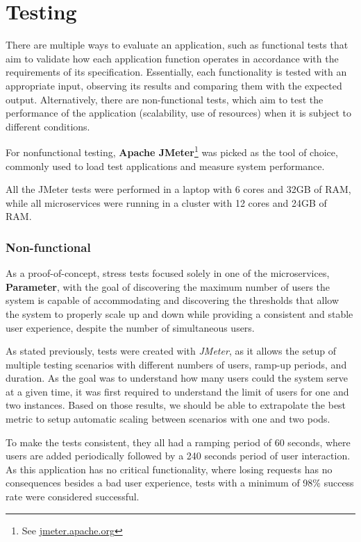 \chapter{Testing}
\label{ch:testing}

There are multiple ways to evaluate an application, such as functional tests that aim to validate how each application function operates in accordance with the requirements of its specification. Essentially, each functionality is tested with an appropriate input, observing its results and comparing them with the expected output. Alternatively, there are non-functional tests, which aim to test the performance of the application (scalability, use of resources) when it is subject to different conditions.

For nonfunctional testing, \textbf{Apache JMeter}\footnote{See \href{https://jmeter.apache.org/}{jmeter.apache.org}} was picked as the tool of choice, commonly used to load test applications and measure system performance.

All the JMeter tests were performed in a laptop with 6 cores and 32GB of RAM, while all microservices were running in a cluster with 12 cores and 24GB of RAM.


\subsection{Non-functional}
\label{s:non-functional}

As a proof-of-concept, stress tests focused solely in one of the microservices, \textbf{Parameter}, with the goal
of discovering the maximum number of users the system is capable of accommodating and discovering the thresholds that allow the system to properly scale up and down while providing a consistent and stable user experience, despite the number of simultaneous users.

As stated previously, tests were created with \textit{JMeter}, as it allows the setup of multiple testing scenarios with different numbers of users, ramp-up periods, and duration. As the goal was to understand how many users could the system serve at a given time, it was first required to understand the limit of users for one and two instances. Based on those results, we should be able to extrapolate the best metric to setup automatic scaling between scenarios with one and two pods.

To make the tests consistent, they all had a ramping period of 60 seconds, where users are added periodically followed by a 240 seconds period of user interaction. As this application has no critical functionality, where losing requests has no consequences besides a bad user experience, tests with a minimum of 98\% success rate were considered successful.

